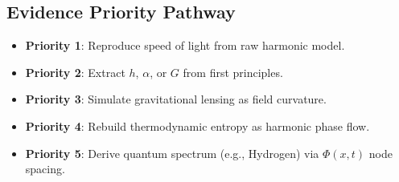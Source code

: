\subsection{Evidence Priority Pathway}

\begin{itemize}
    \item \textbf{Priority 1}: Reproduce speed of light from raw harmonic model.
    \item \textbf{Priority 2}: Extract \(h\), \(\alpha\), or \(G\) from first principles.
    \item \textbf{Priority 3}: Simulate gravitational lensing as field curvature.
    \item \textbf{Priority 4}: Rebuild thermodynamic entropy as harmonic phase flow.
    \item \textbf{Priority 5}: Derive quantum spectrum (e.g., Hydrogen) via \(\Phi(x, t)\) node spacing.
\end{itemize}

